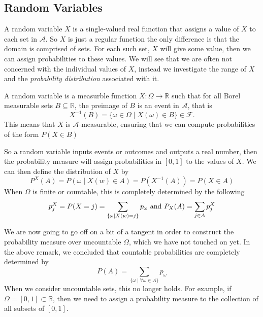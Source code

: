 \documentclass[../main.tex]{subfiles}
\begin{document}
\subsection{Random Variables}
\indent A random variable $X$ is a single-valued real function that assigns 
a value of $X$ to each set in $\mathcal{A}$. So $X$ is just a regular function
the only difference is that the domain is comprised of sets. For each such
set, $X$ will give some value, then we can assign probabilities to these values. We will
see that we are often not concerned with the individual values of $X$, instead
we investigate the range of $X$ and the \textit{probability distribution} associated with it.




\begin{definition} \label{def: Random_Variable}
A random variable is a measurble function $ X: \Omega \to \mathbb{R}$ such that for all Borel measurable sets $ B \subseteq \mathbb{R}$,
the preimage of $B$ is an event in $\mathcal{A}$, that is 
\[
X^{-1}(B) = \{ \omega \in \Omega \mid X(\omega) \in B \} \in \mathcal{F}.
\]
This means that $X$ is $\mathcal{A}$-measurable, ensuring that we can compute probabilities of the form $P(X \in B)$
\end{definition}


\begin{remark}
So a random variable inputs events or outcomes and outputs a real number, then the probability measure will assign probabilities in $[0,1]$ to the values of $X$.
We can then define the distribution of $X$ by
\[
P^X(A) = P({\omega \mid X(w) \in A}) = P(X^{-1}(A)) = P(X \in A)
\]
When $\Omega$ is finite or countable, this is completely determined by the following 
\[
p_j^X = P(X=j) = \sum_{\{\omega \mid X(w) =j\}}{p_\omega} \textnormal{ and } P_X(A) = \sum_{j \in A}{p^X_j}
\]
\end{remark}

\begin{remark}
We are now going to go off on a bit of a tangent in order to construct the probability 
measure over uncountable $\Omega$, which we have not touched on yet. In the
above remark, we concluded that countable probabilities are completely determined by \[
P(A) = \sum_{\{\omega \mid \forall \omega \in A\}}p_\omega
\]
When we consider uncountable sets, this no longer holds. For example, if $\Omega = [0,1] \subset \mathbb{R}$,
then we need to assign a probability measure to the collection of all subsets of $[0,1]$. 
\end{remark}
\end{document}
